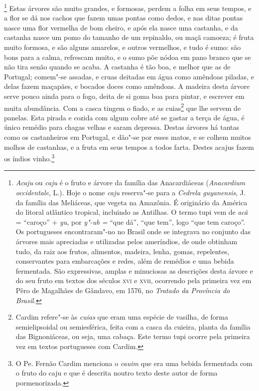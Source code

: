 \footnote{ \textit{Acaju} ou \textit{caju} é
o fruto e árvore da família das Anacardiáceas (\textit{Anacardium
occidentale}, L.). Hoje o nome \textit{caju} reserva"-se para a
\textit{Cedrela guyanensis}, J. da família das Meliáceas, que vegeta
na Amazônia. É originário da América do litoral atlântico tropical,
incluindo as Antilhas. O termo tupi vem de \textit{acã} = ``caroço'' +
\textit{yu}, por \textit{y"-ub =} ``que dá'', ``que tem'', logo ``que tem
caroço''. Os portugueses encontraram"-no no Brasil onde se integrava no
conjunto das árvores mais apreciadas e utilizadas pelos ameríndios, de
onde obtinham tudo, da raiz aos frutos, alimentos, madeira, lenha,
gomas, repelentes, conservantes para embarcações e redes, além de
remédios e uma bebida fermentada. São expressivas, amplas e minuciosas
as descrições desta árvore e do seu fruto em textos dos séculos \textsc{xvi} e
\textsc{xvii}, ocorrendo pela primeira vez em Pêro de Magalhães de Gândavo, em 1576,
no \textit{Tratado da Província do Brasil.}} Estas árvores
são muito grandes, e formosas, perdem a folha em seus tempos, e a flor
se dá nos cachos que fazem umas pontas como dedos, e nas ditas pontas
nasce uma flor vermelha de bom cheiro, e após ela nasce uma castanha, e
da castanha nasce um pomo do tamanho de um repinaldo, ou maçã camoeza;
é fruta muito formosa, e são alguns amarelos, e outros vermelhos, e
tudo é sumo: são bons para a calma, refrescam muito, e o sumo põe nódoa
em pano branco que se não tira senão quando se acaba. A castanha é tão
boa, e melhor que as de Portugal; comem"-se assadas, e cruas deitadas em
água como amêndoas piladas, e delas fazem maçapães, e bocados doces
como amêndoas. A madeira desta árvore serve pouco ainda para o fogo,
deita de si goma boa para pintar, e escrever em muita abundância. Com a
casca tingem o fiado, e as cuias\footnote{ Cardim refere"-se às
\textit{cuias} que eram uma espécie de vasilha, de forma
semielipsoidal ou semiesférica, feita com a casca da cuieira, planta
da família das Bignoniáceas, ou seja, uma cabaça. Este termo tupi
ocorre pela primeira vez em textos portugueses com Cardim.} que lhe
servem de panelas. Esta pirada e cozida com algum cobre até se gastar a
terça de água, é único remédio para chagas velhas e saram depressa.
Destas árvores há tantas como os castanheiros em Portugal, e dão"-se por
esses matos, e se colhem muitos molhos de castanhas, e a fruta em seus
tempos a todos farta. Destes acajus fazem os índios vinho.\footnote{ O
Pe. Fernão Cardim menciona o \textit{cauim} que era uma bebida
fermentada com o fruto do caju e que é descrita noutro texto deste
autor de forma pormenorizada.} 

